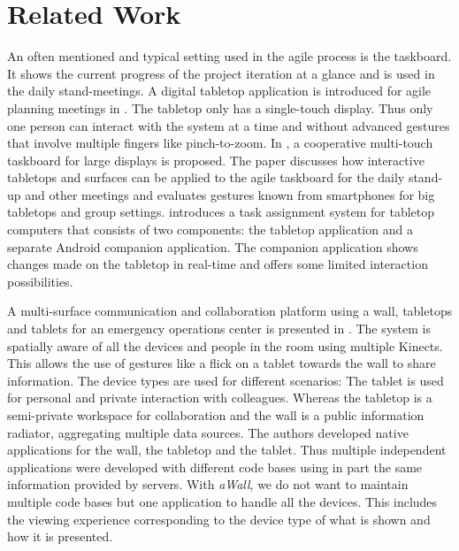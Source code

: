 \documentclass{sigchi}
\begin{document}
\section{Related Work}
An often mentioned and typical setting used in the agile process is the taskboard.
It shows the current progress of the project iteration at a glance and is used in the daily stand-meetings. 
A digital tabletop application is introduced for agile planning meetings in \cite{Ghanam:4599452}. 
The tabletop only has a single-touch display. 
Thus only one person can interact with the system at a time and without advanced gestures that involve multiple fingers like pinch-to-zoom.
In \cite{Rubart:2014:CMS:2669485.2669551}, a cooperative multi-touch taskboard for large displays is proposed. 
The paper discusses how interactive tabletops and surfaces can be applied to the agile taskboard for the daily stand-up and other meetings and evaluates gestures known from smartphones for big tabletops and group settings.
\cite{Haas:2014:TAV:2669485.2669538} introduces a task assignment system for tabletop computers that consists of two components: the tabletop application and a separate Android companion application.
The companion application shows changes made on the tabletop in real-time and offers some limited interaction possibilities.

A multi-surface communication and collaboration platform using a wall, tabletops and tablets for an emergency operations center is presented in \cite{Chokshi:2014:EMM:2669485.2669520}. 
The system is spatially aware of all the devices and people in the room using multiple Kinects.
This allows the use of gestures like a flick on a tablet towards the wall to share information.
The device types are used for different scenarios:
The tablet is used for personal and private interaction with colleagues.
Whereas the tabletop is a semi-private workspace for collaboration and the wall is a public information radiator, aggregating multiple data sources.
The authors developed native applications for the wall, the tabletop and the tablet.
Thus multiple independent applications were developed with different code bases using in part the same information provided by servers.
With \textit{aWall}, we do not want to maintain multiple code bases but one application to handle all the devices.
This includes the viewing experience corresponding to the device type of what is shown and how it is presented.
\end{document}
